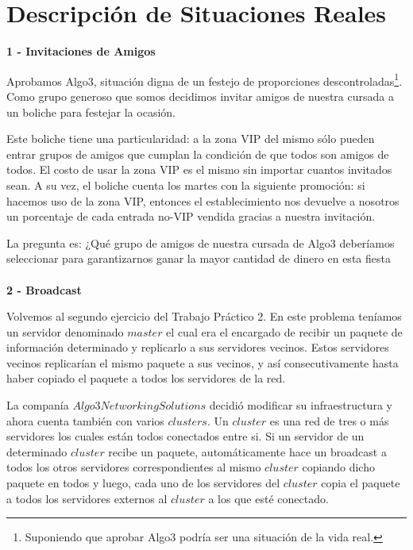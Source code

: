 \section{Descripción de Situaciones Reales}

\textbf{1 - Invitaciones de Amigos}\\

\par{Aprobamos Algo3, situación digna de un festejo de proporciones descontroladas\footnote{Suponiendo que aprobar Algo3 podría ser una situación de la vida real.}. Como grupo generoso que somos decidimos invitar amigos de nuestra cursada a un boliche para festejar la ocasión.}\\

\par{Este boliche tiene una particularidad: a la zona VIP del mismo sólo pueden entrar grupos de amigos que cumplan la condición de que todos son amigos de todos. El costo de usar la zona VIP es el mismo sin importar cuantos invitados sean. A su vez, el boliche cuenta los martes con la siguiente promoción: si hacemos uso de la zona VIP, entonces el establecimiento nos devuelve a nosotros un porcentaje de cada entrada no-VIP vendida gracias a nuestra invitación.}\\

\par{La pregunta es: ¿Qué grupo de amigos de nuestra cursada de Algo3 deberíamos seleccionar para garantizarnos ganar la mayor cantidad de dinero en esta fiesta}
\\\\
\textbf{2 - Broadcast}\\

\par{Volvemos al segundo ejercicio del Trabajo Práctico 2. En este problema teníamos un servidor denominado $master$ el cual era el encargado de recibir un paquete de información determinado y replicarlo a sus servidores vecinos. Estos servidores vecinos replicarían el mismo paquete a sus vecinos, y así consecutivamente hasta haber copiado el paquete a todos los servidores de la red.}\\

\par{La companía $Algo3 Networking Solutions$ decidió modificar su infraestructura y ahora cuenta también con varios $clusters$. Un $cluster$ es una red de tres o más servidores los cuales están todos conectados entre si. Si un servidor de un determinado $cluster$ recibe un paquete, automáticamente hace un broadcast a todos los otros servidores correspondientes al mismo $cluster$ copiando dicho paquete en todos y luego, cada uno de los servidores del $cluster$ copia el paquete a todos los servidores externos al $cluster$ a los que esté conectado.}\\

